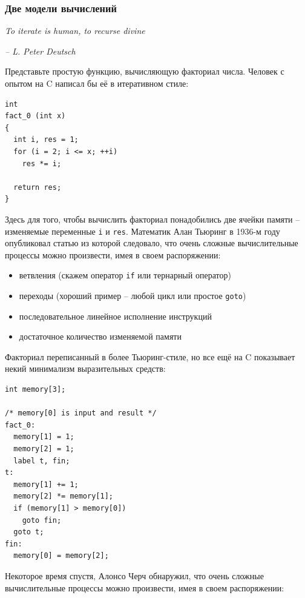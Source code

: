 \documentclass[a4paper,12pt,oneside]{article}
\begin{document}
\subsubsection{Две модели вычислений}\label{ComputationModels}

\hfill\textit{To iterate is human, to recurse divine}{\vspace{0.5em}}

\hfill\textit{-- L. Peter Deutsch}

Представьте простую функцию, вычисляющую факториал числа. Человек с опытом на C написал бы её в итеративном стиле:

\begin{lstlisting}
int
fact_0 (int x)
{
  int i, res = 1;
  for (i = 2; i <= x; ++i)
    res *= i;

  return res;
}
\end{lstlisting}

Здесь для того, чтобы вычислить факториал понадобились две ячейки памяти -- изменяемые переменные \lstinline!i! и \lstinline!res!. Математик Алан Тьюринг в 1936-м году опубликовал статью из которой следовало, что очень сложные вычислительные процессы можно произвести, имея в своем распоряжении:

\begin{itemize}
\item ветвления (скажем оператор \lstinline!if! или тернарный оператор)
\item переходы (хороший пример -- любой цикл или простое \lstinline!goto!)
\item последовательное линейное исполнение инструкций
\item достаточное количество изменяемой памяти
\end{itemize}

Факториал переписанный в более Тьюринг-стиле, но все ещё на C показывает некий минимализм выразительных средств:

\begin{lstlisting}
int memory[3];

/* memory[0] is input and result */
fact_0:
  memory[1] = 1;
  memory[2] = 1;
  label t, fin;
t:
  memory[1] += 1;
  memory[2] *= memory[1];
  if (memory[1] > memory[0]) 
    goto fin;
  goto t;
fin:
  memory[0] = memory[2];
\end{lstlisting}

Некоторое время спустя, Алонсо Черч обнаружил, что очень сложные вычислительные процессы можно произвести, имея в своем распоряжении:
\end{document}
